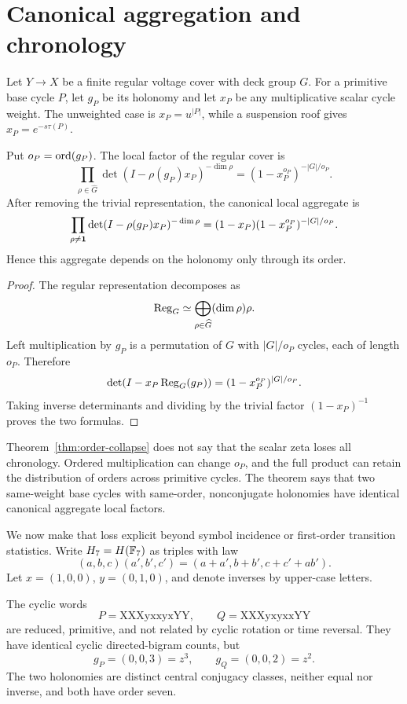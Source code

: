 \section{Canonical aggregation and chronology}
\label{sec:aggregation}

Let \(Y\to X\) be a finite regular voltage cover with deck group \(G\).
For a primitive base cycle \(P\), let \(g_P\) be its holonomy and let
\(x_P\) be any multiplicative scalar cycle weight. The unweighted case is
\(x_P=u^{|P|}\), while a suspension roof gives
\(x_P=e^{-s\tau(P)}\).

\begin{theorem}
\label{thm:order-collapse}
Put \(o_P=\operatorname{ord}(g_P)\). The local factor of the regular cover is
\[
\prod_{\rho\in\widehat G}
\det(I-\rho(g_P)x_P)^{-\dim\rho}
=(1-x_P^{o_P})^{-|G|/o_P}.
\]
After removing the trivial representation, the canonical local aggregate is
\[
\prod_{\rho\ne\mathbf{1}}
\det(I-\rho(g_P)x_P)^{-\dim\rho}
=(1-x_P)(1-x_P^{o_P})^{-|G|/o_P}.
\]
Hence this aggregate depends on the holonomy only through its order.
\end{theorem}

\begin{proof}
The regular representation decomposes as
\[
\operatorname{Reg}_G\simeq
\bigoplus_{\rho\in\widehat G}(\dim\rho)\rho.
\]
Left multiplication by \(g_P\) is a permutation of \(G\) with
\(|G|/o_P\) cycles, each of length \(o_P\). Therefore
\[
\det(I-x_P\operatorname{Reg}_G(g_P))
=(1-x_P^{o_P})^{|G|/o_P}.
\]
Taking inverse determinants and dividing by the trivial factor
\((1-x_P)^{-1}\) proves the two formulas.
\end{proof}

\begin{remark}
Theorem~\ref{thm:order-collapse} does not say that the scalar zeta loses all
chronology. Ordered multiplication can change \(o_P\), and the full product
can retain the distribution of orders across primitive cycles. The theorem
says that two same-weight base cycles with same-order, nonconjugate
holonomies have identical canonical aggregate local factors.
\end{remark}

We now make that loss explicit beyond symbol incidence or first-order
transition statistics. Write \(H_7=H(\mathbb{F}_7)\) as triples with law
\[
(a,b,c)(a',b',c')=(a+a',b+b',c+c'+ab').
\]
Let \(x=(1,0,0)\), \(y=(0,1,0)\), and denote inverses by upper-case letters.

\begin{proposition}
\label{prop:witness}
The cyclic words
\[
P=\mathrm{XXXyxxyxYY},\qquad
Q=\mathrm{XXXyxyxxYY}
\]
are reduced, primitive, and not related by cyclic rotation or time reversal.
They have identical cyclic directed-bigram counts, but
\[
g_P=(0,0,3)=z^3,\qquad g_Q=(0,0,2)=z^2.
\]
The two holonomies are distinct central conjugacy classes, neither equal nor
inverse, and both have order seven.
\end{proposition}

